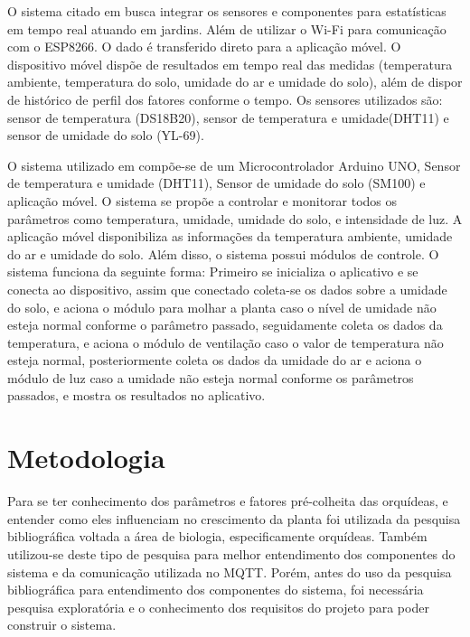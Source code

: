 \documentclass[conference]{IEEEtran}
\begin{document}
O sistema citado em \cite{b21} busca integrar os sensores e componentes para estatísticas em tempo real atuando em jardins. Além de utilizar o Wi-Fi para comunicação com o ESP8266. O dado é transferido direto para a aplicação móvel. O dispositivo móvel dispõe de resultados em tempo real das medidas (temperatura ambiente, temperatura do solo, umidade do ar e umidade do solo), além de dispor de histórico de perfil dos fatores conforme o tempo. 
Os sensores utilizados são: sensor de temperatura (DS18B20), sensor de temperatura e umidade(DHT11) e sensor de umidade do solo (YL-69).

O sistema utilizado em \cite{b10} compõe-se de um Microcontrolador Arduino UNO, Sensor de temperatura e umidade (DHT11), Sensor de umidade do solo (SM100) e aplicação móvel. O sistema se propõe a controlar e monitorar todos os parâmetros como temperatura, umidade, umidade do solo, e intensidade de luz. A aplicação móvel disponibiliza as informações da temperatura ambiente, umidade do ar e umidade do solo. Além disso, o sistema possui módulos de controle. O sistema funciona da seguinte forma: Primeiro se inicializa o aplicativo e se conecta ao dispositivo, assim que conectado coleta-se os dados sobre a umidade do solo, e aciona o módulo para molhar a planta caso o nível de umidade não esteja normal conforme o parâmetro passado, seguidamente coleta os dados da temperatura, e aciona o módulo de ventilação caso o valor de temperatura não esteja normal, posteriormente coleta os dados da umidade do ar e aciona o módulo de luz caso a umidade não esteja normal conforme os parâmetros passados, e mostra os resultados no aplicativo.

\section{Metodologia}
Para se ter conhecimento dos parâmetros e fatores pré-colheita das orquídeas, e entender como eles influenciam no crescimento da planta foi utilizada da pesquisa bibliográfica voltada a área de biologia, especificamente orquídeas. Também utilizou-se deste tipo de pesquisa para melhor entendimento dos componentes do sistema e da comunicação utilizada no MQTT. Porém, antes do uso da pesquisa bibliográfica para entendimento dos componentes do sistema, foi necessária pesquisa exploratória e o conhecimento dos requisitos do projeto para poder construir o sistema.
\end{document}
